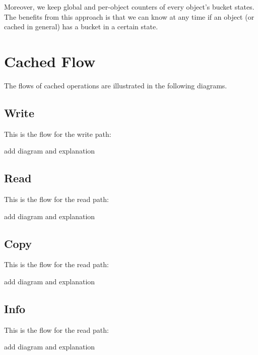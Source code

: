 Moreover, we keep global and per-object counters of every object's bucket 
states. The benefits from this approach is that we can know at any time if an 
object (or cached in general) has a bucket in a certain state.

\section{Cached Flow}\label{sec:cached-flow-design}

The flows of cached operations are illustrated in the following diagrams.


\subsection{Write}

This is the flow for the write path:

\fixme add diagram and explanation

\subsection{Read}

This is the flow for the read path:

\fixme add diagram and explanation

\subsection{Copy}

This is the flow for the read path:

\fixme add diagram and explanation

\subsection{Info}

This is the flow for the read path:

\fixme add diagram and explanation

